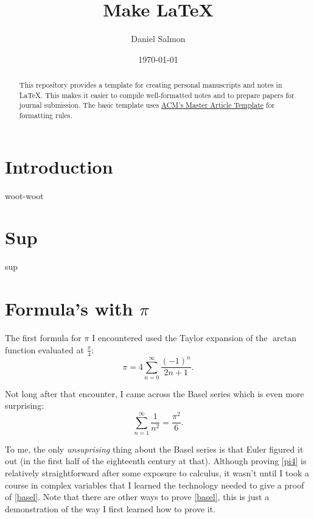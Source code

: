 \documentclass[manuscript,screen,nonacm]{acmart}
\begin{document}
\title{Make \LaTeX}

\author{Daniel Salmon}

\date{\today}

\begin{abstract}
This repository provides a template for creating personal manuscripts
and notes in \LaTeX. This makes it easier to compile well-formatted notes and
to prepare papers for journal submission. The basic template uses
\href{https://www.acm.org/publications/proceedings-template}{ACM's Master
Article Template} for formatting rules.
\end{abstract}

\maketitle

\tableofcontents

\clearpage


\section{Introduction}
\label{sec:intro}

woot-woot

\section{Sup}
\label{sec:sup}

sup

\section{Formula's with $\pi$}

The first formula for $\pi$ I encountered used the Taylor expansion of the
$\arctan$ function evaluated at $\frac{\pi}{4}$:
\begin{equation}\label{pi4}
	\pi=4\sum_{n=0}^{\infty}\frac{(-1)^{n}}{2n + 1}.
\end{equation}

Not long after that encounter, I came across the Basel series which is even
more surprising:
\begin{equation}\label{basel}
	\sum_{n=1}^{\infty}\frac{1}{n^2}=\frac{\pi^2}{6}.
\end{equation}

To me, the only \emph{unsuprising} thing about the Basel series is that Euler
figured it out (in the first half of the eighteenth century at that). Although
proving \eqref{pi4} is relatively straightforward after some exposure to
calculus, it wasn't until I took a course in complex variables that I learned
the technology needed to give a proof of \eqref{basel}. Note that there are
other ways to prove \eqref{basel}, this is just a demonstration of the way I
first learned how to prove it.
\end{document}
